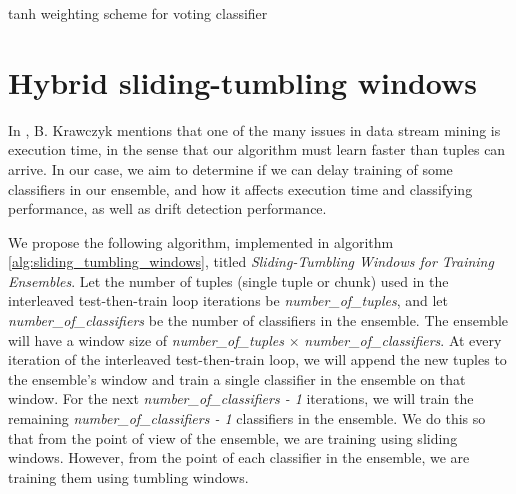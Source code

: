 \begin{algorithm}
    \caption{\label{alg:new_voting_scheme}tanh weighting scheme for voting classifier}
\end{algorithm}




\section{Hybrid sliding-tumbling windows\label{section:hybrid-windows}}
In \cite{KRAWCZYK2017132}, B. Krawczyk mentions that one of the many issues in data stream mining is execution time, in the sense that our algorithm must learn faster than tuples can arrive. In our case, we aim to determine if we can delay training of some classifiers in our ensemble, and how it affects execution time and classifying performance, as well as drift detection performance.

We propose the following algorithm, implemented in algorithm \ref{alg:sliding_tumbling_windows}, titled \textit{Sliding-Tumbling Windows for Training Ensembles}.
Let the number of tuples (single tuple or chunk) used in the interleaved test-then-train loop iterations be \textit{number\_of\_tuples}, and let \textit{number\_of\_classifiers} be the number of classifiers in the ensemble. The ensemble will have a window size of \textit{number\_of\_tuples} $\times$ \textit{number\_of\_classifiers}. At every iteration of the interleaved test-then-train loop, we will append the new tuples to the ensemble's window and train a single classifier in the ensemble on that window. For the next \textit{number\_of\_classifiers - 1} iterations, we will train the remaining \textit{number\_of\_classifiers - 1} classifiers in the ensemble. We do this so that from the point of view of the ensemble, we are training using sliding windows. However, from the point of each classifier in the ensemble, we are training them using tumbling windows.

